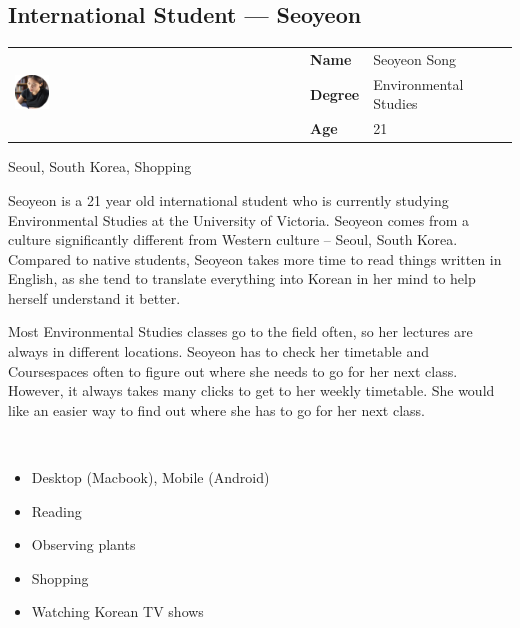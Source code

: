 \documentclass{article}
\begin{document}
\pagebreak
\subsection{International Student --- Seoyeon}

\begin{tabular}{lll}
    \multirow{3}{*}{\includegraphics[width=0.12\textwidth]{img/seoyeon}} & \textbf{Name} & Seoyeon Song \\
    & \textbf{Degree} & Environmental Studies \\
    & \textbf{Age} & 21 \\
\end{tabular}

\begin{description}[leftmargin=\parindent,labelindent=\parindent]
    \item[Demographics] Seoul, South Korea, Shopping

    \item[Background] Seoyeon is a 21 year old international student who is currently studying Environmental Studies at the University of Victoria. Seoyeon comes from a culture significantly different from Western culture -- Seoul, South Korea. Compared to native students, Seoyeon takes more time to read things written in English, as she tend to translate everything into Korean in her mind to help herself understand it better.

    Most Environmental Studies classes go to the field often, so her lectures are always in different locations. Seoyeon has to check her timetable and Coursespaces often to figure out where she needs to go for her next class. However, it always takes many clicks to get to her weekly timetable. She would like an easier way to find out where she has to go for her next class.
    
    \item[Habits]~\\
    
    \begin{itemize}
        \item Desktop (Macbook), Mobile (Android)
        \item Reading
        \item Observing plants
        \item Shopping
        \item Watching Korean TV shows
    \end{itemize}

\end{description}
\end{document}
